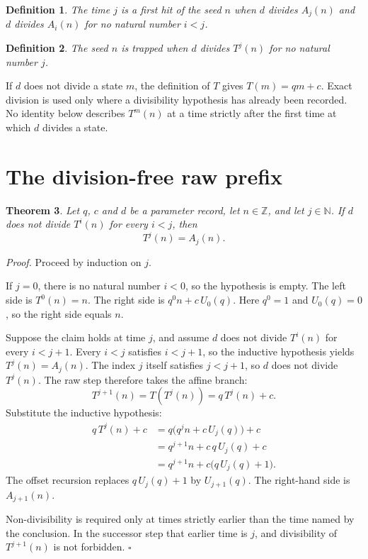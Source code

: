 \documentclass[11pt,letterpaper]{article}
\newcommand{\N}{\mathbb{N}}
\newcommand{\Z}{\mathbb{Z}}
\newtheorem{theorem}{Theorem}
\newtheorem{definition}[theorem]{Definition}
\newenvironment{proof}{\noindent\textit{Proof.}}{\hfill\(\square\)}
\begin{document}
\begin{definition}\label{Def:FirstHit}
The time \(j\) is a first hit of the seed \(n\) when \(d\) divides \(A_{j}(n)\) and \(d\) divides \(A_{i}(n)\) for no natural number \(i<j\).
\end{definition}

\begin{definition}\label{Def:NeverDivides}
The seed \(n\) is trapped when \(d\) divides \(T^{j}(n)\) for no natural number \(j\).
\end{definition}

If \(d\) does not divide a state \(m\), the definition of \(T\) gives \(T(m)=qm+c\). Exact division is used only where a divisibility hypothesis has already been recorded. No identity below describes \(T^{m}(n)\) at a time strictly after the first time at which \(d\) divides a state.

\section{The division-free raw prefix}

\begin{theorem}\label{Thm:PrefixAffine}
Let \(q\), \(c\) and \(d\) be a parameter record, let \(n\in\Z\), and let \(j\in\N\). If \(d\) does not divide \(T^{i}(n)\) for every \(i<j\), then
\[
T^{j}(n)=A_{j}(n).
\]
\end{theorem}

\begin{proof}
Proceed by induction on \(j\).

If \(j=0\), there is no natural number \(i<0\), so the hypothesis is empty. The left side is \(T^{0}(n)=n\). The right side is \(q^{0}n+c\,U_{0}(q)\). Here \(q^{0}=1\) and \(U_{0}(q)=0\), so the right side equals \(n\).

Suppose the claim holds at time \(j\), and assume \(d\) does not divide \(T^{i}(n)\) for every \(i<j+1\). Every \(i<j\) satisfies \(i<j+1\), so the inductive hypothesis yields \(T^{j}(n)=A_{j}(n)\). The index \(j\) itself satisfies \(j<j+1\), so \(d\) does not divide \(T^{j}(n)\). The raw step therefore takes the affine branch:
\[
T^{j+1}(n)=T(T^{j}(n))=q\,T^{j}(n)+c.
\]
Substitute the inductive hypothesis:
\begin{align*}
q\,T^{j}(n)+c
&= q\bigl(q^{j}n+c\,U_{j}(q)\bigr)+c \\
&= q^{j+1}n+c\,q\,U_{j}(q)+c \\
&= q^{j+1}n+c\bigl(q\,U_{j}(q)+1\bigr).
\end{align*}
The offset recursion replaces \(q\,U_{j}(q)+1\) by \(U_{j+1}(q)\). The right-hand side is \(A_{j+1}(n)\).

Non-divisibility is required only at times strictly earlier than the time named by the conclusion. In the successor step that earlier time is \(j\), and divisibility of \(T^{j+1}(n)\) is not forbidden.
\end{proof}
\end{document}

